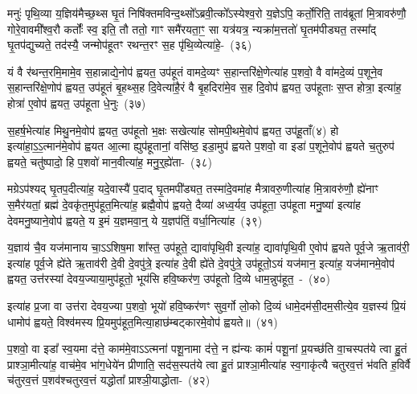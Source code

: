 मनुः॑ पृथि॒व्या य॒ज्ञिय॑मैच्छ॒थ्स घृ॒तं निषि॑क्तमविन्द॒थ्सो᳚\-ऽब्रवी॒त्को᳚\-ऽस्येश्व॒रो य॒ज्ञे\-ऽपि॒ कर्तो॒रिति॒ ताव॑ब्रूतां मि॒त्रावरु॑णौ॒ गोरे॒वावमी᳚श्व॒रौ कर्तोः᳚ स्व॒ इति॒ तौ ततो॒ गाꣳ समै॑रयता॒ꣳ॒ सा यत्र॑यत्र॒ न्यक्रा॑म॒त्ततो॑ घृ॒तम॑पीड्यत॒ तस्मा᳚द् घृ॒तप॑द्युच्यते॒ तद॑स्यै॒ जन्मोप॑हूतꣳ रथन्त॒रꣳ स॒ह पृ॑थि॒व्येत्या॑हे॒-~(३६)\ip

यं वै र॑थन्त॒रमि॒मामे॒व स॒हान्नाद्ये॒नोप॑ ह्वयत॒ उप॑हूतं वामदे॒व्यꣳ स॒हान्तरि॑क्षे॒णेत्या॑ह प॒शवो॒ वै वा॑मदे॒व्यं प॒शूने॒व स॒हान्तरि॑क्षे॒णोप॑ ह्वयत॒ उप॑हूतं बृ॒हथ्स॒ह दि॒वेत्या॑है॒रं वै बृ॒हदिरा॑मे॒व स॒ह दि॒वोप॑ ह्वयत॒ उप॑हूताः स॒प्त होत्रा॒ इत्या॑ह॒ होत्रा॑ ए॒वोप॑ ह्वयत॒ उप॑हूता धे॒नुः~(३७)\ip

स॒हर्\mbox{}ष॒भेत्या॑ह मिथु॒नमे॒वोप॑ ह्वयत॒ उप॑हूतो भ॒क्षः सखेत्या॑ह सोमपी॒थमे॒वोप॑ ह्वयत॒ उप॑हू॒ताँ(४) हो इत्या॑हा॒\-ऽ॒\-ऽ॒त्मान॑मे॒वोप॑ ह्वयत आ॒त्मा ह्युप॑हूतानां॒ वसि॑ष्ठ॒ इडा॒मुप॑ ह्वयते प॒शवो॒ वा इडा॑ प॒शूने॒वोप॑ ह्वयते च॒तुरुप॑ ह्वयते॒ चतु॑ष्पादो॒ हि प॒शवो॑ मान॒वीत्या॑ह॒ मनु॒र्॒\mbox{}ह्ये॑ता-~(३८)\ip

मग्रे\-ऽप॑श्यद् घृ॒तप॒दीत्या॑ह॒ यदे॒वास्यै॑ प॒दाद् घृ॒तमपी᳚ड्यत॒ तस्मा॑दे॒वमा॑ह मैत्रावरु॒णीत्या॑ह मि॒त्रावरु॑णौ॒ ह्ये॑नाꣳ स॒मैर॑यतां॒ ब्रह्म॑ दे॒वकृ॑त॒मुप॑हूत॒मित्या॑ह॒ ब्रह्मै॒वोप॑ ह्वयते॒ दैव्या॑ अध्व॒र्यव॒ उप॑हूता॒ उप॑हूता मनु॒ष्या॑ इत्या॑ह देवमनु॒ष्याने॒वोप॑ ह्वयते॒ य इ॒मं य॒ज्ञमवा॒न्॒ ये य॒ज्ञप॑तिं॒ वर्धा॒नित्या॑ह~(३९)\ip

य॒ज्ञाय॑ चै॒व यज॑मानाय चा॒\-ऽऽ\-शिष॒मा शा᳚स्त॒ उप॑हूते॒ द्यावा॑\-पृथि॒वी इत्या॑ह॒ द्यावा॑\-पृथि॒वी ए॒वोप॑ ह्वयते पूर्व॒जे ऋ॒ताव॑री॒ इत्या॑ह पूर्व॒जे ह्ये॑ते ऋ॒ताव॑री दे॒वी दे॒वपु॑त्रे॒ इत्या॑ह दे॒वी ह्ये॑ते दे॒वपु॑त्रे॒ उप॑हूतो॒\-ऽयं यज॑मान॒ इत्या॑ह॒ यज॑मानमे॒वोप॑ ह्वयत॒ उत्त॑रस्यां देवय॒ज्याया॒मुप॑हूतो॒ भूय॑सि हवि॒ष्कर॑ण॒ उप॑हूतो दि॒व्ये धाम॒न्नुप॑हूत॒~-~(४०)\ip

इत्या॑ह प्र॒जा वा उत्त॑रा देवय॒ज्या प॒शवो॒ भूयो॑ हवि॒ष्कर॑णꣳ सुव॒र्गो लो॒को दि॒व्यं धामे॒दम॑सी॒दम॒सीत्ये॒व य॒ज्ञस्य॑ प्रि॒यं धामोप॑ ह्वयते॒ विश्व॑मस्य प्रि॒यमुप॑हूत॒मित्या॒हाछ॑म्बट्कारमे॒वोप॑ ह्वयते॥~(४१)\ip

{\anuvakamend[{आ॒ह॒ धे॒नुरे॒तां वर्धा॒नित्या॑ह॒ धाम॒न्नुप॑हूत॒श्चतु॑स्त्रिꣳशच्च}]}

प॒शवो॒ वा इडा᳚ स्व॒यमा द॑त्ते॒ काम॑मे॒वा\-ऽऽ\-त्मना॑ पशू॒नामा द॑त्ते॒ न ह्य॑न्यः कामं॑ पशू॒नां प्र॒यच्छ॑ति वा॒चस्पत॑ये त्वा हु॒तं प्राश्ञा॒मीत्या॑ह॒ वाच॑मे॒व भा॑ग॒धेये॑न प्रीणाति॒ सद॑स॒स्पत॑ये त्वा हु॒तं प्राश्ञा॒मीत्या॑ह स्व॒गाकृ॑त्यै चतुरव॒त्तं भ॑वति ह॒विर्वै च॑तुरव॒त्तं प॒शव॑श्चतुरव॒त्तं यद्धोता᳚ प्राश्ञी॒याद्धोता-~(४२)\ip

